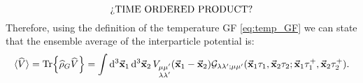 \documentclass[a4paper]{article}
\newcommand{\meanv}[1]{\langle #1 \rangle}
\renewcommand{\hat}{\widehat}
\begin{document}
\begin{equation}
\qq{¿TIME ORDERED PRODUCT?}
\end{equation}
Therefore, using the definition of the temperature GF \eqref{eq:temp_GF} we can state that the ensemble average of the interparticle potential is:
\begin{equation}
\meanv{\hat{V}} = \Tr{\hat{\rho}_G\hat{V}} = \int\dd[3]{\va{x}_1}\dd[3]{\va{x}_2} V_{\substack{\mu\mu'\\\lambda\lambda'}}(\va{x}_1 - \va{x}_2)
\mathcal{G}_{\lambda\lambda';\mu\mu'}(\va{x}_1\tau_1,\va{x}_2\tau_2;\va{x}_1\tau_1^+,\va{x}_2\tau_2^+).
\end{equation}
\end{document}
